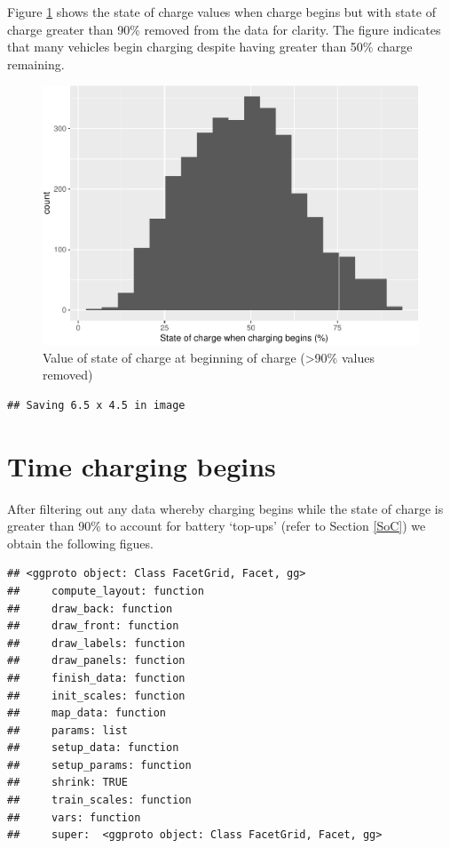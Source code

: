 \documentclass[]{article}
\begin{document}
Figure \ref{fig:SoCplot2} shows the state of charge values when charge
begins but with state of charge greater than 90\% removed from the data
for clarity. The figure indicates that many vehicles begin charging
despite having greater than 50\% charge remaining.

\begin{figure}
\centering
\includegraphics{EVBB_report_files/figure-latex/SoCplot2-1.pdf}
\caption{\label{fig:SoCplot2}Value of state of charge at beginning of charge
(\textgreater{}90\% values removed)}
\end{figure}

\begin{verbatim}
## Saving 6.5 x 4.5 in image
\end{verbatim}

\section{Time charging begins}\label{time-charging-begins}

After filtering out any data whereby charging begins while the state of
charge is greater than 90\% to account for battery `top-ups' (refer to
Section \ref{SoC}) we obtain the following figues.

\begin{verbatim}
## <ggproto object: Class FacetGrid, Facet, gg>
##     compute_layout: function
##     draw_back: function
##     draw_front: function
##     draw_labels: function
##     draw_panels: function
##     finish_data: function
##     init_scales: function
##     map_data: function
##     params: list
##     setup_data: function
##     setup_params: function
##     shrink: TRUE
##     train_scales: function
##     vars: function
##     super:  <ggproto object: Class FacetGrid, Facet, gg>
\end{verbatim}
\end{document}

